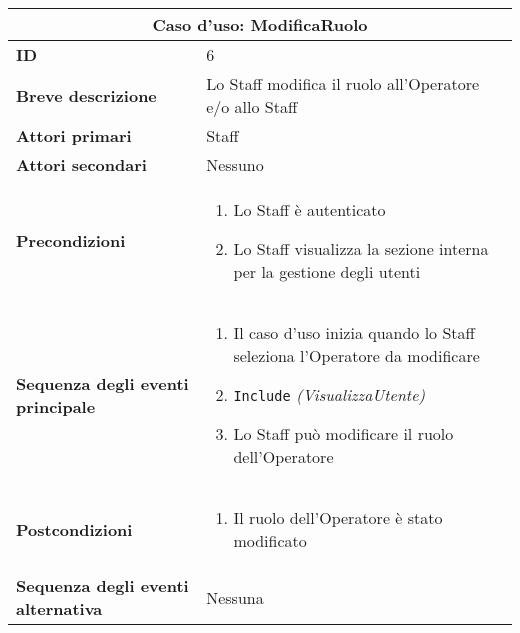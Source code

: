 \documentclass[a4paper]{report}
\begin{document}
\clearpage
\begin{table}[H]
\vspace*{-0cm}
\renewcommand{\arraystretch}{1.9}
\begin{tabular}{|p{3.9cm}|p{9.9cm}|}
\hline
\multicolumn{2}{|c|}{\textbf{Caso d’uso: ModificaRuolo}} \\ \hline
\textbf{ID} & 6 \\ \hline
\textbf{Breve descrizione} & Lo Staff modifica il ruolo all’Operatore e/o allo Staff \\ \hline
\textbf{Attori primari} & Staff \\ \hline
\textbf{Attori secondari} & Nessuno \\ \hline
\textbf{Precondizioni} & \begin{enumerate}[leftmargin=14pt,label=\arabic*.,labelsep=0.5em,topsep=0pt,partopsep=0pt,parsep=0pt,itemsep=0pt]
    \item Lo Staff è autenticato
    \item Lo Staff visualizza la sezione interna per la gestione degli utenti
\end{enumerate} \\ \hline
\textbf{Sequenza degli eventi principale} &
\begin{enumerate}[leftmargin=14pt,label=\arabic*.,labelsep=0.5em,topsep=0pt,partopsep=0pt,parsep=0pt,itemsep=0pt]
    \item Il caso d’uso inizia quando lo Staff seleziona l’Operatore da modificare
    \item \texttt{Include} \textit{(VisualizzaUtente)}
    \item Lo Staff può modificare il ruolo dell’Operatore
\end{enumerate}\\ \hline
\textbf{Postcondizioni} & \begin{enumerate}[leftmargin=14pt,label=\arabic*.,labelsep=0.5em,topsep=0pt,partopsep=0pt,parsep=0pt,itemsep=0pt]
    \item Il ruolo dell’Operatore è stato modificato
    \end{enumerate} \\ \hline
\textbf{Sequenza degli eventi alternativa} & Nessuna\\ \hline
\end{tabular}
\end{table}
\end{document}
